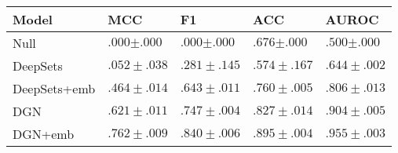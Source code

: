 \begin{tabular}{lllll}
\toprule
Model & \textbf{MCC} & \textbf{F1} & \textbf{ACC} & \textbf{AUROC} \\
\midrule
Null & $.000{\scriptstyle \pm .000}$ & $.000{\scriptstyle \pm .000}$ & $.676{\scriptstyle \pm .000}$ & $.500{\scriptstyle \pm .000}$ \\
DeepSets & $.052\scriptstyle \pm .038$ & $.281\scriptstyle \pm .145$ & $.574\scriptstyle \pm .167$ & $.644\scriptstyle \pm .002$ \\
DeepSets+emb & $.464\scriptstyle \pm .014$ & $.643\scriptstyle \pm .011$ & $.760\scriptstyle \pm .005$ & $.806\scriptstyle \pm .013$ \\
DGN & $.621\scriptstyle \pm .011$ & $.747\scriptstyle \pm .004$ & $.827\scriptstyle \pm .014$ & $.904\scriptstyle \pm .005$ \\
DGN+emb & $\mathbf{.762\scriptstyle \pm .009}$ & $\mathbf{.840\scriptstyle \pm .006}$ & $\mathbf{.895\scriptstyle \pm .004}$ & $\mathbf{.955\scriptstyle \pm .003}$ \\
\bottomrule
\end{tabular}
